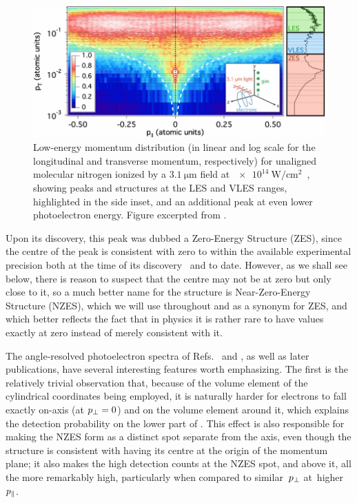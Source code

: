 \begin{figure}[htb]
  \centering
  \includegraphics[scale=1]{6-LES/Figures/figure6D.jpg}
  \caption[
  Observation of (Near-)Zero Energy Structures by Pullen et al.
  ]{
  Low-energy momentum distribution (in linear and log scale for the longitudinal and transverse momentum, respectively) for unaligned molecular nitrogen ionized by a $\SI{3.1}{\micro\meter}$ field at $\SI{e14}{\watt/\centi\meter^2}$~\cite{ pullen_kinematically_2014}, showing peaks and structures at the LES and VLES ranges, highlighted in the side inset, and an additional peak at even lower photoelectron energy.
  Figure excerpted from .
  }
\label{f6-pullen-original-full-spectrum}
\end{figure}






Upon its discovery, this peak was dubbed a Zero-Energy Structure (ZES), since the centre of the peak is consistent with zero to within the available experimental precision both at the time of its discovery~\cite{pullen_kinematically_2014} and to date. However, as we shall see below, there is reason to suspect that the centre may not be at zero but only close to it, so a much better name for the structure is Near-Zero-Energy Structure (NZES), which we will use throughout and as a synonym for ZES, and which better reflects the fact that in physics it is rather rare to have values exactly at zero instead of merely consistent with it.


The angle-resolved photoelectron spectra of Refs.~\cite{dura_ionization_2013} and \cite{pullen_kinematically_2014}, as well as later publications, have several interesting features worth emphasizing. The first is the relatively trivial observation that, because of the volume element of the cylindrical coordinates being employed, it is naturally harder for electrons to fall exactly on-axis (at ${p_{\perp}}=0$) and on the volume element around it, which explains the detection probability on the lower part of . This effect is also responsible for making the NZES form as a distinct spot separate from the axis, even though the structure is consistent with having its centre at the origin of the momentum plane; it also makes the high detection counts at the NZES spot, and above it, all the more remarkably high, particularly when compared to similar~${p_{\perp}}$ at~higher ${p_{\parallel}}$.


